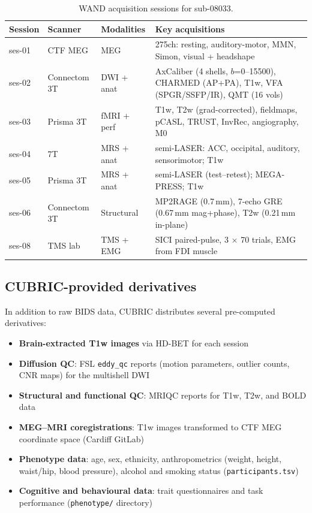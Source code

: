\documentclass[11pt,a4paper]{article}\usepackage[]{graphicx}\usepackage[]{xcolor}
\begin{document}
\begin{table}[htbp]
\centering
\caption{WAND acquisition sessions for sub-08033.}
\label{tab:wand}
\begin{tabular}{lllp{6.5cm}}
\toprule
Session & Scanner & Modalities & Key acquisitions \\
\midrule
ses-01 & CTF MEG      & MEG          & 275ch: resting, auditory-motor, MMN, Simon, visual + headshape \\
ses-02 & Connectom 3T & DWI + anat   & AxCaliber (4 shells, $b$=0--15500), CHARMED (AP+PA), T1w, VFA (SPGR/SSFP/IR), QMT (16 vols) \\
ses-03 & Prisma 3T    & fMRI + perf  & T1w, T2w (grad-corrected), fieldmaps, pCASL, TRUST, InvRec, angiography, M0 \\
ses-04 & 7T           & MRS + anat   & semi-LASER: ACC, occipital, auditory, sensorimotor; T1w \\
ses-05 & Prisma 3T    & MRS + anat   & semi-LASER (test--retest); MEGA-PRESS; T1w \\
ses-06 & Connectom 3T & Structural   & MP2RAGE (0.7\,mm), 7-echo GRE (0.67\,mm mag+phase), T2w (0.21\,mm in-plane) \\
ses-08 & TMS lab      & TMS + EMG    & SICI paired-pulse, 3 $\times$ 70 trials, EMG from FDI muscle \\
\bottomrule
\end{tabular}
\end{table}

\subsection{CUBRIC-provided derivatives}

In addition to raw BIDS data, CUBRIC distributes several pre-computed
derivatives:

\begin{itemize}
  \item \textbf{Brain-extracted T1w images} via HD-BET for each session
  \item \textbf{Diffusion QC}: FSL \texttt{eddy\_qc} reports (motion
    parameters, outlier counts, CNR maps) for the multishell DWI
  \item \textbf{Structural and functional QC}: MRIQC reports for T1w,
    T2w, and BOLD data
  \item \textbf{MEG--MRI coregistrations}: T1w images transformed to
    CTF MEG coordinate space (Cardiff GitLab)
  \item \textbf{Phenotype data}: age, sex, ethnicity, anthropometrics
    (weight, height, waist/hip, blood pressure), alcohol and smoking
    status (\texttt{participants.tsv})
  \item \textbf{Cognitive and behavioural data}: trait questionnaires
    and task performance (\texttt{phenotype/} directory)
\end{itemize}
\end{document}
